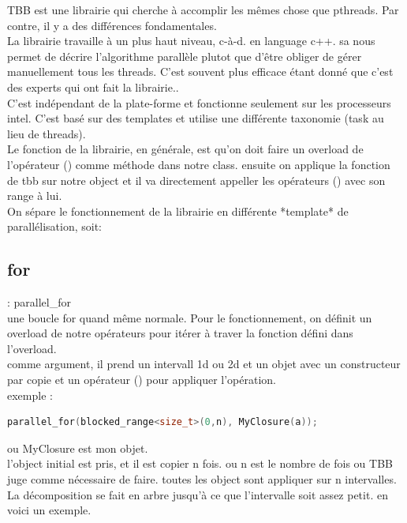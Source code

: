 \documentclass[oneside]{book}
\begin{document}
TBB est une librairie qui cherche à accomplir les mêmes chose que pthreads. Par contre, il y a des différences fondamentales. \\

La librairie travaille à un plus haut niveau, c-à-d. en language c++. sa nous permet de décrire l'algorithme parallèle plutot que d'être obliger de gérer manuellement tous les threads. C'est souvent plus efficace étant donné que c'est des experts qui ont fait la librairie..\\

C'est indépendant de la plate-forme et fonctionne seulement sur les processeurs intel. C'est basé sur des templates et utilise une différente taxonomie (task au lieu de threads). \\

Le fonction de la librairie, en générale, est qu'on doit faire un overload de l'opérateur () comme méthode dans notre class. ensuite on applique la fonction de tbb sur notre object et il va directement appeller les opérateurs () avec son range à lui.\\

On sépare le fonctionnement de la librairie en différente *template* de parallélisation, soit:


\subsection{for} : parallel\_for\\
une boucle for quand même normale. Pour le fonctionnement, on définit un overload de notre opérateurs pour itérer à traver la fonction défini dans l'overload. \\

comme argument, il prend un intervall 1d ou 2d et un objet avec un constructeur par copie et un opérateur () pour appliquer l'opération.\\

exemple : 
\begin{lstlisting}[language=C++]
parallel_for(blocked_range<size_t>(0,n), MyClosure(a));
\end{lstlisting}
 ou MyClosure est mon objet.\\


l'object initial est pris, et il est copier n fois. ou n est le nombre de fois ou TBB juge comme nécessaire de faire. toutes les object sont appliquer sur n intervalles. \\

La décomposition se fait en arbre jusqu'à ce que l'intervalle soit assez petit. en voici un exemple.
\end{document}
